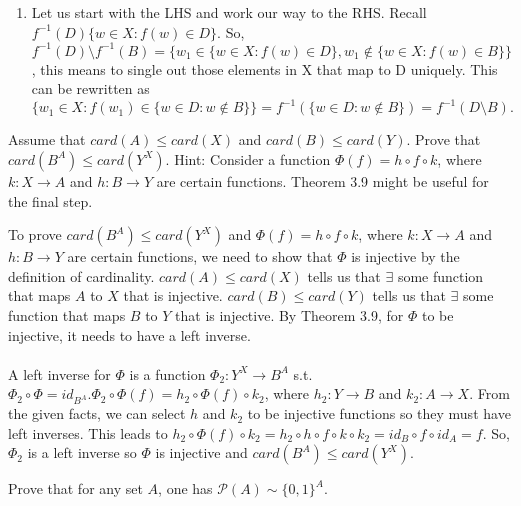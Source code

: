 \documentclass[12pt,letterpaper,boxed]{hmcpset}
\begin{document}
\begin{solution}
\begin{enumerate}
\begin{enumerate}
		\end{enumerate}
	\item Let us start with the LHS and work our way to the RHS. Recall $f^{-1}(D)\{w \in X : f(w) \in D\}.$ So, $f^{-1}(D)\setminus f^{-1}(B)= \{ w_1 \in \{ w \in X : f(w)\in D\}, w_1 \notin \{ w \in X : f(w)\in B\} \}$, this means to single out those elements in X that map to D uniquely. This can be rewritten as $\{ w_1 \in X : f(w_1) \in \{ w \in D : w \notin B \} \} = f^{-1}(\{w \in D : w \notin B \}) = f^{-1}(D\setminus B).$
\end{enumerate}
\end{solution}

\begin{problem}[Exercise 4.5]
Assume that $card(A) \leq card(X)$ and $card(B) \leq card(Y).$ Prove that $card(B^{A}) \leq card(Y^{X})$. Hint: Consider a function $\Phi(f) = h \circ f \circ k$,
where $k : X \rightarrow A$ and $h : B \rightarrow Y$ are certain functions. Theorem 3.9 might be useful for the final step.
 \end{problem}

\begin{solution}
To prove $card(B^{A}) \leq card(Y^{X})$ and $\Phi(f) = h \circ f \circ k$,
where $k : X \rightarrow A$ and $h : B \rightarrow Y$ are certain functions, we need to show that $\Phi$ is injective by the definition of cardinality. $card(A) \leq card(X)$ tells us that $\exists$ some function that maps $A$ to $X$ that is injective. $card(B) \leq card(Y)$ tells us that $\exists$ some function that maps $B$ to $Y$ that is injective. By Theorem 3.9, for $\Phi$ to be injective, it needs to have a left inverse. \\ \\
A left inverse for $\Phi$ is a function $\Phi_2 : Y^{X} \rightarrow B^{A}$ s.t. $\Phi_2 \circ \Phi = id_{B^{A}}. \Phi_2 \circ \Phi(f) = h_2 \circ \Phi(f) \circ k_2$, where $h_2 : Y\rightarrow B$ and $k_2:A\rightarrow X.$ From the given facts, we can select $h$ and $k_2$ to be injective functions so they must have left inverses. This leads to $h_2 \circ \Phi(f) \circ k_2 = h_2 \circ h \circ f \circ k \circ k_2 = id_{B}\circ f \circ id_{A}=f.$ So, $\Phi_2$ is a left inverse so $\Phi$ is injective and $card(B^{A}) \leq card(Y^{X}).$
\end{solution}

\begin{problem}[Exercise 4.7]
Prove that for any set $A$, one has $\mathcal{P}(A) \sim \{0,1\}^{A}$.
\end{problem}
\end{document}
